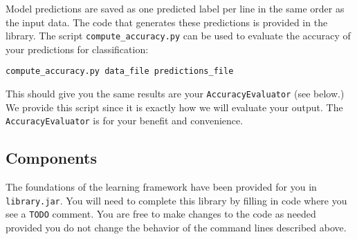 \documentclass[11pt]{article}
\begin{document}
Model predictions are saved as one predicted label per line in the same order as the input data. The code that generates these predictions is provided in the library. The script {\tt compute\_accuracy.py} can be used to evaluate the accuracy of your predictions for classification:
\begin{footnotesize}
\begin{verbatim}
compute_accuracy.py data_file predictions_file
\end{verbatim}
\end{footnotesize}

This should give you the same results are your {\tt AccuracyEvaluator} (see below.) We provide this script since it is exactly how we will evaluate your 
output. The {\tt AccuracyEvaluator} is for your benefit and convenience.

\subsection{Components}
The foundations of the learning framework have been provided for you in {\tt library.jar}. You will need to complete this library by filling in code where you see a {\tt TODO} comment. You are free to make changes to the code as needed provided you do not change the behavior of the command lines described above.
\end{document}
